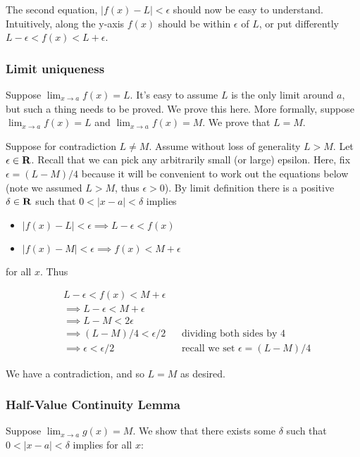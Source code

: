 \vs

The second equation, $|f(x)-L|<\epsilon$ should now be easy to understand.
Intuitively, along the y-axis $f(x)$ should be within $\epsilon$ of
$L$, or put differently $L-\epsilon<f(x)<L+\epsilon$.

\subsubsection{Limit uniqueness}

Suppose $\lim_{x\to a}f(x)=L$. It's easy to assume $L$ is the only limit
around $a$, but such a thing needs to be proved. We prove this here.
More formally, suppose $\lim_{x\to a}f(x)=L$ and
$\lim_{x\to a}f(x)=M$. We prove that $L=M$.

\vs

Suppose for contradiction $L\neq M$. Assume without loss of generality
$L>M$. Let $\epsilon\in\mathbf{R}$. Recall that we can pick any arbitrarily small (or
large) epsilon. Here, fix $\epsilon=(L-M)/4$ because it will be convenient to
work out the equations below (note we assumed $L>M$, thus
$\epsilon>0$). By limit definition there is a positive $\delta\in\mathbf{R}$ such that
$0<|x-a|<\delta$ implies

\begin{itemize}
\item $|f(x)-L|<\epsilon\implies L-\epsilon<f(x)$
\item $|f(x)-M|<\epsilon\implies f(x)<M+\epsilon$
\end{itemize}
    
for all $x$. Thus

\begin{align*}
    &L-\epsilon<f(x)<M+\epsilon\\
    &\implies L-\epsilon<M+\epsilon\\
    &\implies L-M<2\epsilon\\
    &\implies (L-M)/4<\epsilon/2&&\text{dividing both sides by 4}\\
    &\implies \epsilon<\epsilon/2&&\text{recall we set $\epsilon=(L-M)/4$}
\end{align*}

We have a contradiction, and so $L=M$ as desired.

\subsubsection{Half-Value Continuity Lemma}

Suppose $\lim_{x\to a}g(x)=M$. We show that there exists some $\delta$ such
that $0<|x-a|<\delta$ implies for all $x$:

